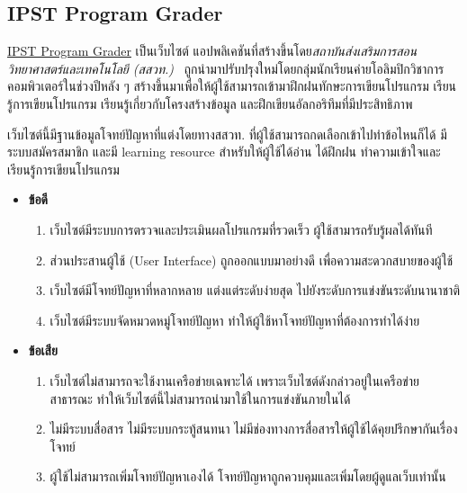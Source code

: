\documentclass[12pt,oneside,openright,a4paper]{cpe-thai-project}
\begin{document}
    \subsection{IPST Program Grader}
    \begin{flushleft}
    \href{https://programming.in.th}{IPST Program Grader} เป็นเว็บไซต์ แอปพลิเคชันที่สร้างขึ้นโดย\textit{สถาบันส่งเสริมการสอนวิทยาศาสตร์และเทคโนโลยี (สสวท.)}~\cite{ipstGrader} ถูกนำมาปรับปรุงใหม่โดยกลุ่มนักเรียนค่ายโอลิมปิกวิชาการคอมพิวเตอร์ในช่วงปีหลัง ๆ สร้างขึ้นมาเพื่อให้ผู้ใช้สามารถเข้ามาฝึกฝนทักษะการเขียนโปรแกรม เรียนรู้การเขียนโปรแกรม เรียนรู้เกี่ยวกับโครงสร้างข้อมูล และฝึกเขียนอัลกอริทึมที่มีประสิทธิภาพ
    \end{flushleft}
    \begin{flushleft}
    เว็บไซต์นี้มีฐานข้อมูลโจทย์ปัญหาที่แต่งโดยทางสสวท. ที่ผู้ใช้สามารถกดเลือกเข้าไปทำข้อไหนก็ได้ มีระบบสมัครสมาชิก และมี learning resource สำหรับให้ผู้ใช้ได้อ่าน ได้ฝึกฝน ทำความเข้าใจและเรียนรู้การเขียนโปรแกรม 
    \end{flushleft}
    \begin{itemize}
        \item \textbf{ข้อดี}
        \begin{enumerate}
            \item เว็บไซต์มีระบบการตรวจและประเมินผลโปรแกรมที่รวดเร็ว ผู้ใช้สามารถรับรู้ผลได้ทันที
            \item ส่วนประสานผู้ใช้ (User Interface) ถูกออกแบบมาอย่างดี เพื่อความสะดวกสบายของผู้ใช้
            \item เว็บไซต์มีโจทย์ปัญหาที่หลากหลาย แต่งแต่ระดับง่ายสุด ไปยังระดับการแข่งขันระดับนานาชาติ
            \item เว็บไซต์มีระบบจัดหมวดหมู่โจทย์ปัญหา ทำให้ผู้ใช้หาโจทย์ปัญหาที่ต้องการทำได้ง่าย
        \end{enumerate}
        \item \textbf{ข้อเสีย}
        \begin{enumerate}
            \item เว็บไซต์ไม่สามารถจะใช้งานเครือข่ายเฉพาะได้ เพราะเว็บไซต์ดังกล่าวอยู่ในเครือข่ายสาธารณะ ทำให้เว็บไซต์นี้ไม่สามารถนำมาใช้ในการแข่งขันภายในได้
            \item ไม่มีระบบสื่อสาร ไม่มีระบบกระทู้สนทนา ไม่มีช่องทางการสื่อสารให้ผู้ใช้ได้คุยปรึกษากันเรื่องโจทย์
            \item ผู้ใช้ไม่สามารถเพิ่มโจทย์ปัญหาเองได้ โจทย์ปัญหาถูกควบคุมและเพิ่มโดยผู้ดูแลเว็บเท่านั้น
        \end{enumerate}
    \end{itemize}
\end{document}

